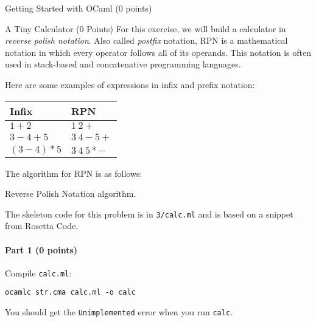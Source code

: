 \documentclass[11pt]{article}
\begin{document}
\begin{problem}{Getting Started with OCaml (0 points)}
% 

\end{problem}

\newpage
\begin{problem}{A Tiny Calculator (0 Points)}
For this exercise, we will build a calculator in \emph{reverse polish notation}. Also called \emph{postfix} notation, RPN is a mathematical notation in which every operator follows all of its operands. This notation is often used in stack-based and concatenative programming languages.

Here are some examples of expressions in infix and prefix notation:

\begin{tabular}{|l|l|}
\hline
\textbf{Infix} & \textbf{RPN}\\
\hline
\hline
$1 + 2$ & $1~2 +$\\
$3 - 4 + 5$ & $3~4 - 5 +$\\
$(3 - 4) * 5$ & $3~4~5 * -$\\
\hline
\end{tabular}

The algorithm for RPN is as follows:
\begin{algorithm}
\caption{Reverse Polish Notation algorithm.}
\end{algorithm}

The skeleton code for this problem is in \texttt{3/calc.ml} and is based on a snippet from Rosetta Code.

\paragraph{Part 1 (0 points)}
Compile \texttt{calc.ml}:
\begin{verbatim}
ocamlc str.cma calc.ml -o calc
\end{verbatim}
You should get the \texttt{Unimplemented} error when you run \texttt{calc}.


\end{problem}
\end{document}
